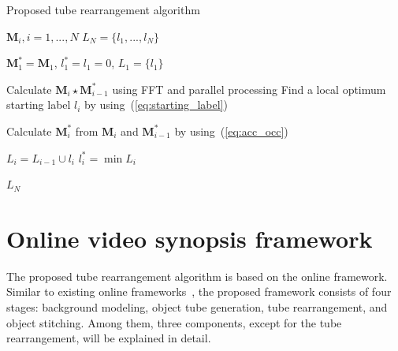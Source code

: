 \documentclass[11pt]{hyu_thesis}
\begin{document}
\begin{algorithm}[t]
	\caption{Proposed tube rearrangement algorithm}
	\label{alg:proposed}
	\begin{algorithmic}
		\REQUIRE $\textbf{M}_{i}, i = 1,...,N$
		\ENSURE $L_{N} = \{ l_{1},...,l_{N} \}$
		
		\STATE $\textbf{M}_{1}^{*} = \textbf{M}_{1}$, $l_{1}^{*} = l_{1} = 0$, $L_{1} = \{ l_{1} \}$
		
		\STATE Calculate $\textbf{M}_{i} \star \textbf{M}_{i-1}^{*}$ using FFT and parallel processing
		\STATE Find a local optimum starting label $l_{i}$ by using~(\ref{eq:starting_label})

		\STATE Calculate $\textbf{M}_{i}^{*}$ from $\textbf{M}_{i}$ and $\textbf{M}_{i-1}^{*}$ by using~(\ref{eq:acc_occ})

		\STATE $L_{i} = L_{i-1} \cup l_{i}$
		\STATE $l_{i}^{*} = \min L_{i}$
		\ENDFOR
		
		\RETURN $L_{N}$
	\end{algorithmic}
\end{algorithm}
\chapter{Online video synopsis framework}
\label{sec:framework}
The proposed tube rearrangement algorithm is based on the online framework. Similar to existing online frameworks~\cite{Fu2014,JianqingZhu2015,He2017}, the proposed framework consists of four stages: background modeling, object tube generation, tube rearrangement, and object stitching. Among them, three components, except for the tube rearrangement, will be explained in detail.
\end{document}
